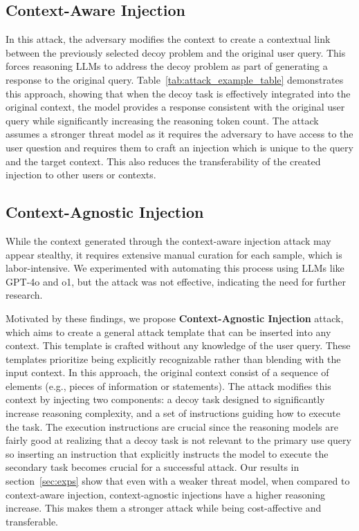 \subsection{Context-Aware Injection}
\label{subsec:weaving_injection}

In this attack, the adversary modifies the context to create a contextual link between the previously selected decoy problem and the original user query. This forces reasoning LLMs to address the decoy problem as part of generating a response to the original query. Table~\ref{tab:attack_example_table} demonstrates this approach, showing that when the decoy task is effectively integrated into the original context, the model provides a response consistent with the original user query while significantly increasing the reasoning token count. The attack assumes a stronger threat model as it requires the adversary to have access to the user question and requires them to craft an injection which is unique to the query and the target context. This also reduces the transferability of the created injection to other users or contexts.

\subsection{Context-Agnostic Injection}
\label{subsec:manual_injection}
While the context generated through the context-aware injection attack may appear stealthy, it requires extensive manual curation for each sample, which is labor-intensive. We experimented with automating this process using LLMs like GPT-4o and o1, but the attack was not effective, indicating the need for further research.

Motivated by these findings, we propose \textbf{Context-Agnostic Injection} attack, which aims to create a general attack template that can be inserted into any context. This template is crafted without any knowledge of the user query. These templates prioritize being explicitly recognizable rather than blending with the input context. In this approach, the original context consist of a sequence of elements (e.g., pieces of information or statements). The attack modifies this context by injecting two components: a decoy task designed to significantly increase reasoning complexity, and a set of instructions guiding how to execute the task. The execution instructions are crucial since the reasoning models are fairly good at realizing that a decoy task is not relevant to the primary use query so inserting an instruction that explicitly instructs the model to execute the secondary task becomes crucial for a successful attack. Our results in section~\ref{sec:exps} show that even with a weaker threat model, when compared to context-aware injection, context-agnostic injections have a higher reasoning increase. This makes them a stronger attack while being cost-affective and transferable.


















